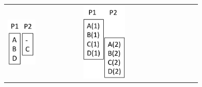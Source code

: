 \documentclass[sigconf, screen, natbib=false, dvipsnames, table]{acmart}
\theoremstyle{definition}
\begin{document}
\begin{figure}[tbhp]
\begin{tabular}{lll}


\begin{minipage}[b]{4.25cm}
\includegraphics[width=0.4\textwidth]{figs/HPCloop.pdf}
\end{minipage}

&

\begin{minipage}[b]{4.25cm}
\includegraphics[width=0.4\textwidth]{figs/HPCdoacrossLoop.pdf}
\end{minipage}

&


\end{tabular}
\end{figure}
\end{document}
